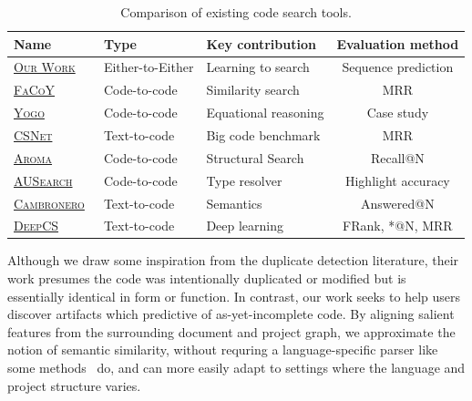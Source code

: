 \documentclass[11pt]{article}
\begin{document}
{ %
\renewcommand{\arraystretch}{1.5}
\begin{table}[H]
  \tiny
  \begin{tabular}{lllc}
    Name & Type & Key contribution & Evaluation method \\
    \hline
    \href{https://github.com/breandan/gym-fs}{\textsc{Our Work}} & Either-to-Either & Learning to search & Sequence prediction \\
    \href{https://core.ac.uk/download/pdf/162022846.pdf#page=7}{\textsc{FaCoY}}~\citep{kim2018facoy} & Code-to-code & Similarity search & MRR \\
    \href{http://www.jameskoppel.com/files/papers/yogo-preprint.pdf#page=11}{\textsc{Yogo}}~\cite{premtoon2020semantic}     & Code-to-code & Equational reasoning & Case study \\
    \href{https://arxiv.org/pdf/1909.09436.pdf#page=5}{\textsc{CSNet}}~\citep{husain2019codesearchnet}     & Text-to-code & Big code benchmark & MRR \\
    \href{https://arxiv.org/pdf/1812.01158.pdf#section.5}{\textsc{Aroma}}~\citep{luan2019aroma}     & Code-to-code & Structural Search& Recall@N \\
    \href{https://raw.githubusercontent.com/mhilmiasyrofi/AUSearch/master/SANER_2020_AUSearch.pdf}{\textsc{AUSearch}}~\citep{asyrofi2020ausearch}     & Code-to-code & Type resolver & Highlight accuracy \\

    \href{https://arxiv.org/pdf/1905.03813.pdf#section.4}{\textsc{Cambronero}}~\citep{cambronero2019deep}     & Text-to-code & Semantics & Answered@N \\
    \href{https://guxd.github.io/papers/deepcs.pdf#section.5}{\textsc{DeepCS}}~\citep{gu2018deep}     & Text-to-code & Deep learning & FRank, *@N, MRR \\
  \end{tabular}
  \caption{\label{tab:ad_comparison} Comparison of existing code search tools.}
\end{table}
}

Although we draw some inspiration from the duplicate detection literature, their work presumes the code was intentionally duplicated or modified but is essentially identical in form or function. In contrast, our work seeks to help users discover artifacts which predictive of as-yet-incomplete code. By aligning salient features from the surrounding document and project graph, we approximate the notion of semantic similarity, without requring a language-specific parser like some methods~\citep{cambronero2019deep} do, and can more easily adapt to settings where the language and project structure varies.
\end{document}
